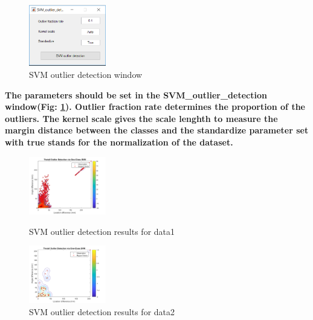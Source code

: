 \documentclass[5p]{elsarticle}
\begin{document}
\begin{frontmatter}
\begin{figure}[h!]
  \begin{center}
    \includegraphics[width=0.3\textwidth]{SVM_outlier_detection.PNG}
  \end{center}
  \caption{SVM outlier detection window}
  \label{fig_12}
\end{figure}
\bf The parameters should be set in the SVM_outlier_detection window(Fig: \ref{fig_12}). Outlier fraction rate determines the proportion of the outliers. The kernel scale gives the scale lenghth to measure the margin distance between the classes and the standardize parameter set with true stands for the normalization of the dataset.

\begin{figure}[h!]
  \begin{minipage}
  \begin{center}
    \includegraphics[width=0.3\textwidth]{SVM_od_bd.png}
  \end{center}
  \caption{SVM outlier detection results for data1}
  \end{minipage}
  \begin{minipage}
  \begin{center}
    \includegraphics[width=0.3\textwidth]{SVM_od_m.png}
  \end{center}
  \caption{SVM outlier detection results for data2}
  \end{minipage}
  \label{fig_13}  
\end{figure}


\end{frontmatter}
\end{document}
